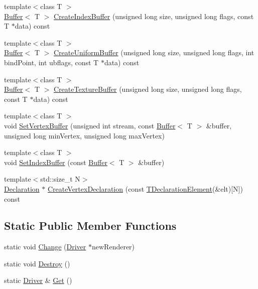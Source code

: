 \begin{DoxyCompactItemize}
\item 
{\footnotesize template$<$class T $>$ }\\\hyperlink{class_agmd_1_1_buffer}{Buffer}$<$ T $>$ \hyperlink{class_agmd_1_1_driver_a487edfdc09992541069350015f8469f4}{Create\+Index\+Buffer} (unsigned long size, unsigned long flags, const T $\ast$data) const 
\item 
{\footnotesize template$<$class T $>$ }\\\hyperlink{class_agmd_1_1_buffer}{Buffer}$<$ T $>$ \hyperlink{class_agmd_1_1_driver_a578e8bcd7fadd7ca91f9458a3ffbc5b2}{Create\+Uniform\+Buffer} (unsigned long size, unsigned long flags, int bind\+Point, int ubflags, const T $\ast$data) const 
\item 
{\footnotesize template$<$class T $>$ }\\\hyperlink{class_agmd_1_1_buffer}{Buffer}$<$ T $>$ \hyperlink{class_agmd_1_1_driver_a3bc39deb272f255473fdff8ce31e3ade}{Create\+Texture\+Buffer} (unsigned long size, unsigned long flags, const T $\ast$data) const 
\item 
{\footnotesize template$<$class T $>$ }\\void \hyperlink{class_agmd_1_1_driver_a98eb12fd4fd70f082790b1b43e952cd6}{Set\+Vertex\+Buffer} (unsigned int stream, const \hyperlink{class_agmd_1_1_buffer}{Buffer}$<$ T $>$ \&buffer, unsigned long min\+Vertex, unsigned long max\+Vertex)
\item 
{\footnotesize template$<$class T $>$ }\\void \hyperlink{class_agmd_1_1_driver_a5dccb83b805c97bc4b50c92999055737}{Set\+Index\+Buffer} (const \hyperlink{class_agmd_1_1_buffer}{Buffer}$<$ T $>$ \&buffer)
\item 
{\footnotesize template$<$std\+::size\+\_\+t N$>$ }\\\hyperlink{class_agmd_1_1_declaration}{Declaration} $\ast$ \hyperlink{class_agmd_1_1_driver_a72eb9394e625625f8dfbff52c23a78f8}{Create\+Vertex\+Declaration} (const \hyperlink{struct_agmd_1_1_t_declaration_element}{T\+Declaration\+Element}(\&elt)\mbox{[}N\mbox{]}) const 
\end{DoxyCompactItemize}
\subsection*{Static Public Member Functions}
\begin{DoxyCompactItemize}
\item 
static void \hyperlink{class_agmd_1_1_driver_a0e0c8fdd9df8f038dd42a0c15e763ffa}{Change} (\hyperlink{class_agmd_1_1_driver}{Driver} $\ast$new\+Renderer)
\item 
static void \hyperlink{class_agmd_1_1_driver_a0b25d6cef85fa193a413d193bc26b71a}{Destroy} ()
\item 
static \hyperlink{class_agmd_1_1_driver}{Driver} \& \hyperlink{class_agmd_1_1_driver_aedf84a4d782cbaad6a5d5eb1fd17b682}{Get} ()
\end{DoxyCompactItemize}
